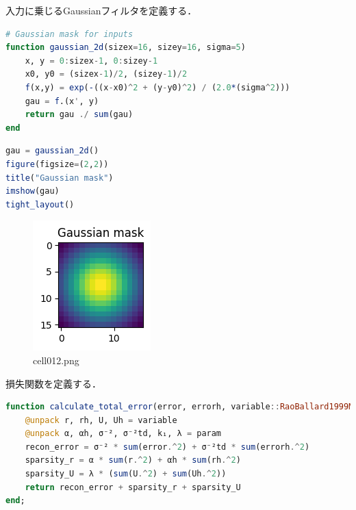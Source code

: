 入力に乗じるGaussianフィルタを定義する．
\begin{lstlisting}[language=julia]
# Gaussian mask for inputs
function gaussian_2d(sizex=16, sizey=16, sigma=5)
    x, y = 0:sizex-1, 0:sizey-1
    x0, y0 = (sizex-1)/2, (sizey-1)/2
    f(x,y) = exp(-((x-x0)^2 + (y-y0)^2) / (2.0*(sigma^2)))
    gau = f.(x', y)
    return gau ./ sum(gau)
end
\end{lstlisting}
\begin{lstlisting}[language=julia]
gau = gaussian_2d()
figure(figsize=(2,2))
title("Gaussian mask")
imshow(gau)
tight_layout()
\end{lstlisting}
\begin{figure}[ht]
	\centering
	\includegraphics[scale=0.8, max width=\linewidth]{./fig/energy-based-model/predictive-coding/cell012.png}
	\caption{cell012.png}
	\label{cell012.png}
\end{figure}
損失関数を定義する．
\begin{lstlisting}[language=julia]
function calculate_total_error(error, errorh, variable::RaoBallard1999Model, param::RBParameter)
    @unpack r, rh, U, Uh = variable
    @unpack α, αh, σ⁻², σ⁻²td, k₁, λ = param
    recon_error = σ⁻² * sum(error.^2) + σ⁻²td * sum(errorh.^2)
    sparsity_r = α * sum(r.^2) + αh * sum(rh.^2)
    sparsity_U = λ * (sum(U.^2) + sum(Uh.^2))
    return recon_error + sparsity_r + sparsity_U
end;
\end{lstlisting}
